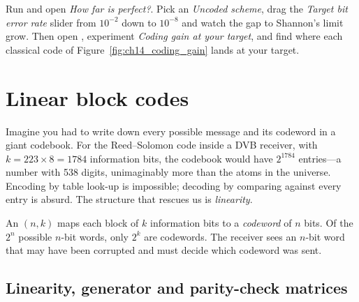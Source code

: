 \begin{tryit}
Run  and open \emph{How far is perfect?}. Pick an
\emph{Uncoded scheme}, drag the \emph{Target bit error rate} slider from $10^{-2}$ down to
$10^{-8}$ and watch the gap to Shannon's limit grow. Then open ,
experiment \emph{Coding gain at your target}, and find where each classical code of
Figure~\ref{fig:ch14_coding_gain} lands at your target.
\end{tryit}

\section{Linear block codes}
\label{sec:ch14:block}

Imagine you had to write down every possible message and its codeword in a giant codebook. For the
Reed--Solomon code inside a DVB receiver, with $k=223\times8=1784$ information bits, the codebook would
have $2^{1784}$ entries---a number with 538 digits, unimaginably more than the atoms in the
universe. Encoding by table look-up is impossible; decoding by comparing against every entry is
absurd. The structure that rescues us is \emph{linearity}.

An $(n,k)$  maps each block of $k$ information bits to a \emph{codeword} of $n$
bits. Of the $2^n$ possible $n$-bit words, only $2^k$ are codewords. The receiver sees an $n$-bit word
that may have been corrupted and must decide which codeword was sent.


\subsection{Linearity, generator and parity-check matrices}


